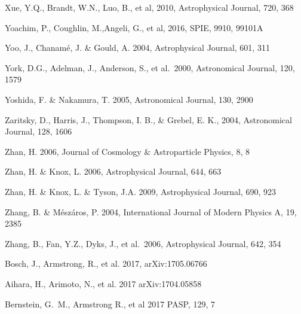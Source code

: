 \documentclass[twocolumn]{aastex61}
\begin{document}
\begin{thebibliography}{}
 Xue, Y.Q., Brandt, W.N., Luo, B., et al, 2010,  Astrophysical Journal, 720, 368

 Yoachim, P., Coughlin, M.,Angeli, G., et al, 2016, SPIE, 9910, 99101A

 Yoo, J., Chanam\'{e}, J. \& Gould, A. 2004, Astrophysical Journal, 601, 311

 York, D.G., Adelman, J., Anderson, S., et al.~2000, Astronomical Journal, 120, 1579

 Yoshida, F. \& Nakamura, T. 2005, Astronomical Journal, 130, 2900

 Zaritsky, D., Harris, J., Thompson, I. B., \& Grebel, E. K., 2004, Astronomical Journal, 128, 1606

 Zhan, H. 2006, Journal of Cosmology \& Astroparticle Physics, 8, 8

 Zhan, H. \& Knox, L. 2006,  Astrophysical Journal, 644, 663

 Zhan, H. \& Knox, L. \& Tyson, J.A. 2009,  Astrophysical Journal, 690, 923

 Zhang, B. \& M\'{e}sz\'{a}ros, P. 2004, International Journal of Modern Physics A, 19, 2385

 Zhang, B., Fan, Y.Z., Dyks, J., et al.~2006,  Astrophysical Journal, 642, 354

 Bosch, J., Armstrong, R., et al. 2017, arXiv:1705.06766

 Aihara, H., Arimoto, N., et al. 2017 arXiv:1704.05858

 Bernstein, G.~M., Armstrong R., et al 2017 PASP, 129, 7

\end{thebibliography}
\end{document}
